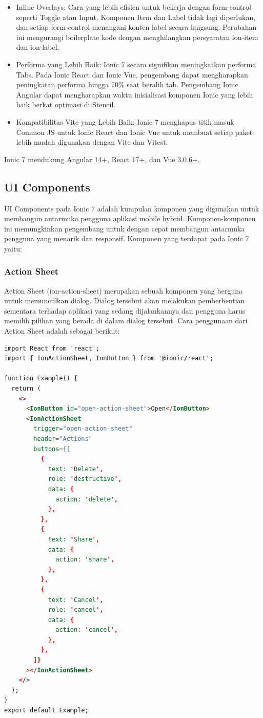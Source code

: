 \begin{itemize}
    \item Inline Overlays: Cara yang lebih efisien untuk bekerja dengan form-control seperti Toggle atau Input. Komponen Item dan Label tidak lagi diperlukan, dan setiap form-control menangani konten label secara langsung. Perubahan ini mengurangi boilerplate kode dengan menghilangkan persyaratan ion-item dan ion-label.
    \item Performa yang Lebih Baik: Ionic 7 secara signifikan meningkatkan performa Tabs. Pada Ionic React dan Ionic Vue, pengembang dapat mengharapkan peningkatan performa hingga 70\% saat beralih tab. Pengembang Ionic Angular dapat mengharapkan waktu inisialisasi komponen Ionic yang lebih baik berkat optimasi di Stencil.
    \item Kompatibilitas Vite yang Lebih Baik: Ionic 7 menghapus titik masuk Common JS untuk Ionic React dan Ionic Vue untuk membuat setiap paket lebih mudah digunakan dengan Vite dan Vitest.
\end{itemize}
Ionic 7 mendukung Angular 14+, React 17+, dan Vue 3.0.6+.

\subsection{UI Components}
UI Components pada Ionic 7 adalah kumpulan komponen yang digunakan untuk membangun antarmuka pengguna aplikasi mobile hybrid. Komponen-komponen ini memungkinkan pengembang untuk dengan cepat membangun antarmuka pengguna yang menarik dan responsif. Komponen yang terdapat pada Ionic 7 yaitu:

\subsubsection{Action Sheet}
Action Sheet (ion-action-sheet) merupakan sebuah komponen yang berguna untuk memunculkan dialog. Dialog tersebut akan melakukan pemberhentian sementara terhadap aplikasi yang sedang dijalankannya dan pengguna harus memilih pilihan yang berada di dalam dialog tersebut. Cara penggunaan dari Action Sheet adalah sebagai berikut:

\begin{lstlisting}[language=HTML, caption=Contoh kode untuk membuat Action Sheet, label=kode:ion-action-sheet]
import React from 'react';
import { IonActionSheet, IonButton } from '@ionic/react';

function Example() {
  return (
    <>
      <IonButton id="open-action-sheet">Open</IonButton>
      <IonActionSheet
        trigger="open-action-sheet"
        header="Actions"
        buttons={[
          {
            text: 'Delete',
            role: 'destructive',
            data: {
              action: 'delete',
            },
          },
          {
            text: 'Share',
            data: {
              action: 'share',
            },
          },
          {
            text: 'Cancel',
            role: 'cancel',
            data: {
              action: 'cancel',
            },
          },
        ]}
      ></IonActionSheet>
    </>
  );
}
export default Example;
\end{lstlisting}

